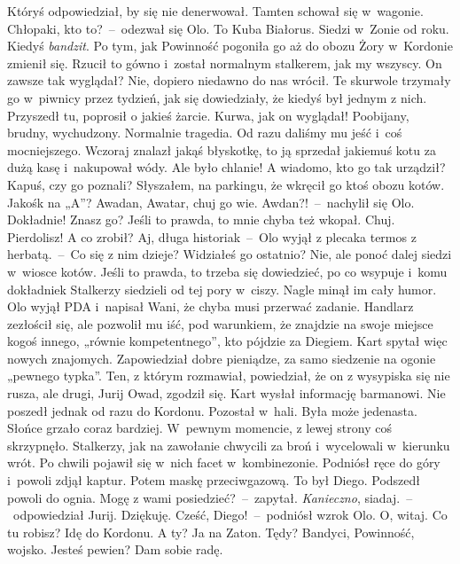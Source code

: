 \documentclass[../MAIN.tex]{subfiles}
\begin{document}
\qd
\hspace{12.8em}Któryś odpowiedział, by się nie denerwował. Tamten schował się w~wagonie.
\sx Chłopaki, kto to?~--~odezwał się Olo.
\xx To Kuba Białorus. Siedzi w~Zonie od roku. Kiedyś \textit{bandzit}. Po tym, jak Powinność pogoniła go aż do obozu Żory w~Kordonie zmienił się. Rzucił to gówno i~został normalnym stalkerem, jak my wszyscy.
\xx On zawsze tak wyglądał?
\xx Nie, dopiero niedawno do nas wrócił. Te skurwole trzymały go w~piwnicy przez tydzień, jak się dowiedziały, że kiedyś był jednym z nich. Przyszedł tu, poprosił o jakieś żarcie. Kurwa, jak on wyglądał! Poobijany, brudny, wychudzony. Normalnie tragedia. Od razu daliśmy mu jeść i~coś mocniejszego. Wczoraj znalazł jakąś błyskotkę, to ją sprzedał jakiemuś kotu za dużą kasę i~nakupował wódy. Ale było chlanie!
\xx A wiadomo, kto go tak urządził? Kapuś, czy go poznali?
\xx Słyszałem, na parkingu, że wkręcił go ktoś obozu kotów. Jakoś\3k na „A”? Awadan, Awatar, chuj go wie.
\xx Awdan?!~--~nachylił się Olo.
\xx Dokładnie! Znasz go?
\xx Jeśli to prawda, to mnie chyba też wkopał. Chuj.
\xx Pierdolisz! A co zrobił?
\xx Aj, długa historia\3k~--~Olo wyjął z plecaka termos z herbatą.~--~Co się z nim dzieje? Widziałeś go ostatnio?
\xx Nie, ale ponoć dalej siedzi w~wiosce kotów.
\xx Jeśli to prawda, to trzeba się dowiedzieć, po co wsypuje i~komu dokładnie\3k
\qd
Stalkerzy siedzieli od tej pory w~ciszy. Nagle minął im cały humor. Olo wyjął PDA i~napisał Wani, że chyba musi przerwać zadanie. Handlarz zezłościł się, ale pozwolił mu iść, pod warunkiem, że znajdzie na swoje miejsce kogoś innego, „równie kompetentnego”, kto pójdzie za Diegiem. Kart spytał więc nowych znajomych. Zapowiedział dobre pieniądze, za samo siedzenie na ogonie „pewnego typka”. Ten, z którym rozmawiał, powiedział, że on z wysypiska się nie rusza, ale drugi, Jurij Owad, zgodził się. Kart wysłał informację barmanowi. Nie poszedł jednak od razu do Kordonu. Pozostał w~hali.
\pp
Była może jedenasta. Słońce grzało coraz bardziej. W~pewnym momencie, z lewej strony coś skrzypnęło. Stalkerzy, jak na zawołanie chwycili za broń i~wycelowali w~kierunku wrót. Po chwili pojawił się w~nich facet w~kombinezonie. Podniósł ręce do góry i~powoli zdjął kaptur. Potem maskę przeciwgazową. To był Diego. Podszedł powoli do ognia.
\sx Mogę z wami posiedzieć?~--~zapytał.
\xx \textit{Kanieczno}, siadaj.~--~odpowiedział Jurij.
\xx Dziękuję.
\xx Cześć, Diego!~--~podniósł wzrok Olo.
\xx O, witaj. Co tu robisz?
\xx Idę do Kordonu. A ty?
\xx Ja na Zaton.
\xx Tędy? Bandyci, Powinność, wojsko. Jesteś pewien?
\xx Dam sobie radę.
\qd
\end{document}
